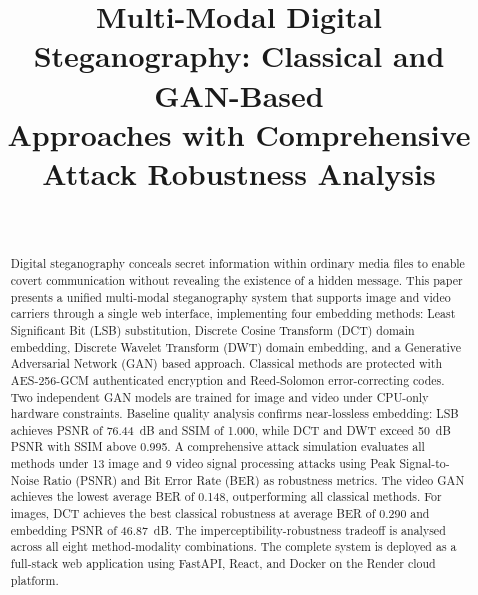 \documentclass[conference]{IEEEtran}
\begin{document}
\title{Multi-Modal Digital Steganography: Classical and GAN-Based\\
Approaches with Comprehensive Attack Robustness Analysis}

\author{
\\[3pt]
}

\maketitle

\begin{abstract}
Digital steganography conceals secret information within ordinary media
files to enable covert communication without revealing the existence of
a hidden message. This paper presents a unified multi-modal
steganography system that supports image and video carriers
through a single web interface, implementing four embedding methods:
Least Significant Bit (LSB) substitution, Discrete Cosine Transform
(DCT) domain embedding, Discrete Wavelet Transform (DWT) domain
embedding, and a Generative Adversarial Network (GAN) based approach.
Classical methods are protected with AES-256-GCM authenticated
encryption and Reed-Solomon error-correcting codes. Two independent
GAN models are trained for image and video under CPU-only
hardware constraints. Baseline quality analysis confirms near-lossless
embedding: LSB achieves PSNR of 76.44~dB and SSIM of 1.000, while DCT
and DWT exceed 50~dB PSNR with SSIM above 0.995. A comprehensive attack
simulation evaluates all methods under 13 image and 9 video
signal processing attacks using Peak Signal-to-Noise Ratio (PSNR) and
Bit Error Rate (BER) as robustness metrics. The video GAN achieves the
lowest average BER of 0.148, outperforming all classical methods. For
images, DCT achieves the best classical robustness at average BER of
0.290 and embedding PSNR of 46.87~dB. The imperceptibility-robustness
tradeoff is analysed across all eight method-modality combinations.
The complete system is deployed as a full-stack web application using
FastAPI, React, and Docker on the Render cloud platform.
\end{abstract}
\end{document}
